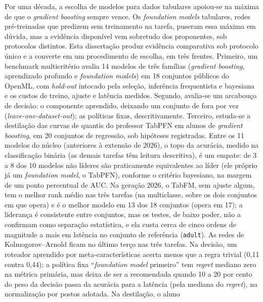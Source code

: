 Por uma década, a escolha de modelos para dados tabulares apoiou-se na
máxima de que o \emph{gradient boosting} sempre vence. Os
\emph{foundation models} tabulares, redes pré-treinadas que predizem sem
treinamento na tarefa, puseram essa máxima em dúvida, mas a
evidência disponível vem sobretudo dos proponentes, sob protocolos
distintos. Esta dissertação produz evidência comparativa sob
protocolo único e a converte em um procedimento de escolha, em três
frentes. Primeiro, um benchmark multicritério avalia 14
modelos de três famílias (\emph{gradient boosting}, aprendizado profundo
e \emph{foundation models}) em 18 conjuntos públicos do OpenML, com
\emph{hold-out} intocado pela seleção, inferência frequentista e
bayesiana e os custos de treino, ajuste e latência medidos. Segundo,
avalia-se um arcabouço de decisão: o componente aprendido, deixando
um conjunto de fora por vez (\emph{leave-one-dataset-out}); as
políticas fixas, descritivamente. Terceiro,
estuda-se a destilação das curvas de quantis do professor TabPFN em
alunos de \emph{gradient boosting}, em 20 conjuntos de regressão, sob
hipóteses registradas. Entre os 11 modelos do núcleo (anteriores à
extensão de 2026), o topo da
acurácia, medido na classificação binária (as demais tarefas têm
leitura descritiva), é um empate: de 3 a 8 dos 10 modelos não líderes são
praticamente equivalentes ao líder (ele próprio já um \emph{foundation
model}, o TabPFN), conforme o critério bayesiano, na margem de um
ponto percentual de AUC. Na geração 2026, o
TabFM, sem ajuste algum, tem o melhor rank médio nas três tarefas (na
multiclasse, sobre os dois conjuntos em que opera) e é o
melhor modelo em 13 dos 18 conjuntos (opera em 17); a liderança é
consistente
entre conjuntos, mas os testes, de baixo poder, não a confirmam como
separação estatística, e ela custa cerca de cinco ordens de
magnitude a mais em latência
no conjunto de referência (\texttt{adult}). As
redes de Kolmogorov--Arnold ficam no último terço nas três tarefas. Na
decisão, um roteador aprendido por meta-características acerta menos que
a regra trivial (0,11 contra 0,44); a política fixa ``\emph{foundation
model} primeiro'' tem \emph{regret} mediano zero na métrica primária,
mas deixa de ser a recomendada quando 10 a 20 por cento do peso da
decisão passa da acurácia para a latência (pela mediana do
\emph{regret}), na normalização por postos
adotada. Na destilação, o aluno
